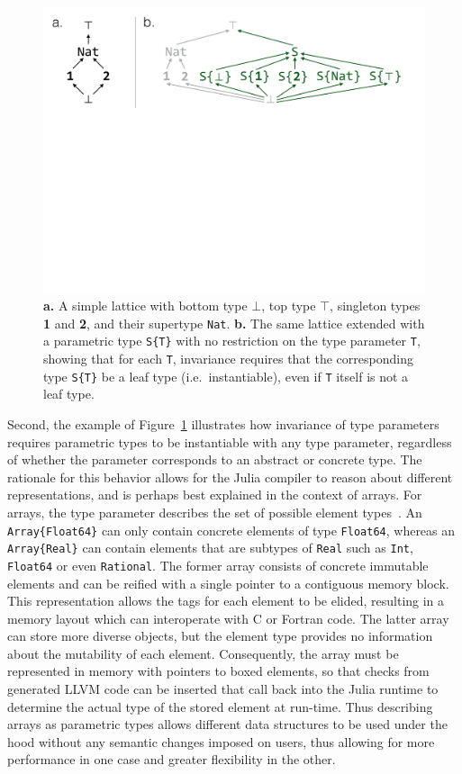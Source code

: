 \documentclass[10pt, preprint]{sigplanconf}
\begin{document}
\begin{figure}
	\centering
	\includegraphics[width=\columnwidth]{fig-lattice}
	\caption{
		\textbf{a.} A simple lattice with bottom type $\bot$, top type
		$\top$, singleton types \textbf{1} and \textbf{2}, and their
		supertype \texttt{Nat}.
		\textbf{b.} The same lattice extended with a parametric type
		\texttt{S\{T\}} with no restriction on the type parameter
		\texttt{T}, showing that for each \texttt{T}, invariance
		requires that the corresponding type \texttt{S\{T\}} be a leaf
		type (i.e.\ instantiable), even if \texttt{T} itself is not a
		leaf type.}
	\label{fig:lattice}
\end{figure}

Second, the example of Figure~\ref{fig:lattice} illustrates how invariance of
type parameters requires parametric types to be instantiable with any type
parameter, regardless of whether the parameter corresponds to an abstract or
concrete type. The rationale for this behavior allows for the Julia compiler to
reason about different representations, and is perhaps best explained in the
context of arrays. For arrays, the type parameter describes the set of possible
element types~\cite{Bezanson2014}. An \verb|Array{Float64}|
can only contain concrete elements of type \verb|Float64|, whereas an
\verb|Array{Real}| can contain elements that are subtypes of \verb|Real| such
as \verb|Int|, \verb|Float64| or even \verb|Rational|. The former array
consists of concrete immutable elements and can be reified with a single
pointer to a contiguous memory block. This representation allows the tags for each element to be elided,
resulting in a memory layout which can interoperate with C or Fortran code.
The latter array can store more diverse objects,
but the element type provides no information about the mutability of each
element. Consequently, the array must be represented in memory with pointers to
boxed elements, so that checks from generated LLVM code can be inserted that
call back into the Julia runtime to determine the actual type of the stored
element at run-time. Thus describing arrays as parametric types allows
different data structures to be used under the hood without any semantic
changes imposed on users, thus allowing for more performance in one case and
greater flexibility in the other.
\end{document}
